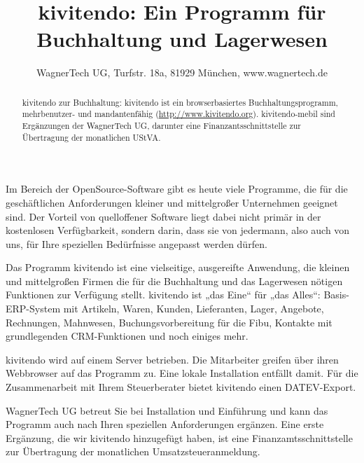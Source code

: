 \documentclass{scrartcl}
\title{kivitendo: Ein Programm für Buchhaltung und Lagerwesen}
\author{WagnerTech UG, Turfstr. 18a, 81929 München, www.wagnertech.de}
\date{\vspace{-5ex}}
\begin{document}
\maketitle

\begin{abstract}
kivitendo zur Buchhaltung: kivitendo ist ein browserbasiertes Buchhaltungsprogramm, mehrbenutzer- und mandantenfähig (\url{http://www.kivitendo.org}). kivitendo-mebil sind Ergänzungen der WagnerTech UG, darunter eine Finanzantsschnittstelle zur Übertragung
der monatlichen UStVA.

\end{abstract}

\begin{multicols}{2}
Im Bereich der OpenSource-Software gibt es heute viele Programme, die für die geschäftlichen Anforderungen kleiner und mittelgroßer Unternehmen geeignet sind. Der Vorteil von quelloffener Software liegt dabei nicht primär in der kostenlosen Verfügbarkeit, sondern darin, dass sie von jedermann, also auch von uns, für Ihre speziellen Bedürfnisse angepasst werden dürfen.

Das Programm kivitendo ist eine vielseitige, ausgereifte Anwendung, die kleinen und mittelgroßen Firmen
die für die Buchhaltung und das Lagerwesen nötigen Funktionen zur Verfügung stellt. kivitendo ist „das Eine“ für „das Alles“: Basis-ERP-System mit Artikeln, Waren, Kunden, Lieferanten, Lager, Angebote, Rechnungen, Mahnwesen, Buchungsvorbereitung für die Fibu, Kontakte mit grundlegenden CRM-Funktionen und noch einiges mehr.

kivitendo wird auf einem Server betrieben. Die Mitarbeiter greifen über ihren Webbrowser auf das Programm zu. Eine lokale
Installation entfällt damit.
Für die Zusammenarbeit mit Ihrem Steuerberater bietet kivitendo einen DATEV-Export.

WagnerTech UG betreut Sie bei Installation und Einführung und kann das Programm auch nach Ihren speziellen Anforderungen
ergänzen. Eine erste Ergänzung, die wir kivitendo hinzugefügt haben, ist eine Finanzamtsschnittstelle zur Übertragung der
monatlichen Umsatzsteueranmeldung.
\end{multicols}

\begin{figure} [h]
   \centering
   \label{abb:screenshot}
\end{figure}
\end{document}
